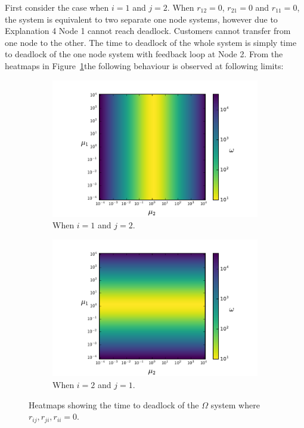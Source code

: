\documentclass{article}
\begin{document}
First consider the case when $i = 1$ and $j = 2$.
When $r_{12} = 0$, $r_{21} = 0$ and $r_{11} = 0$, the system is equivalent to two separate one node systems, however due to Explanation 4 Node 1 cannot reach deadlock. Customers cannot transfer from one node to the other. The time to deadlock of the whole system is simply time to deadlock of the one node system with feedback loop at Node 2. From the heatmaps in Figure~\ref{fig:rjj}the following behaviour is observed at following limits:

\begin{figure}[htbp!]
	\begin{center}
	  \begin{subfigure}{0.45\textwidth}
		\includegraphics[width=\textwidth]{images/r22.pdf}
		\caption{When $i = 1$ and $j = 2$.}
	  \end{subfigure}
	  \begin{subfigure}{0.45\textwidth}
		\includegraphics[width=\textwidth]{images/r11.pdf}
		\caption{When $i = 2$ and $j = 1$.}
	  \end{subfigure}
	\end{center}
	\caption{Heatmaps showing the time to deadlock of the $\Omega$ system where $r_{ij}, r_{ji}, r_{ii} = 0$.}
	\label{fig:rjj}
\end{figure}
\end{document}
